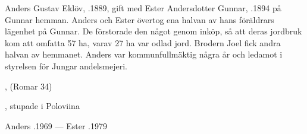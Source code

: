 Anders Gustav Eklöv, .1889, gift med Ester Andersdotter Gunnar, .1894 på Gunnar hemman. Anders och Ester övertog ena halvan av hans föräldrars lägenhet på Gunnar. De förstorade den något genom inköp, så att deras jordbruk kom att omfatta 57 ha, varav 27 ha var odlad jord. Brodern Joel fick andra halvan av hemmanet. Anders var kommunfullmäktig några år och ledamot i styrelsen för Jungar andelsmejeri.
\begin{jhchildren}
  \item {}
  \item {}, (Romar 34)
  \item {}
  \item {}
  \item {}, stupade i Poloviina
  \item {}
  \item {}
  \item {}
  \item {}
  \item {}
  \item {}
  \item {}
\end{jhchildren}

Anders .1969  ---  Ester .1979


